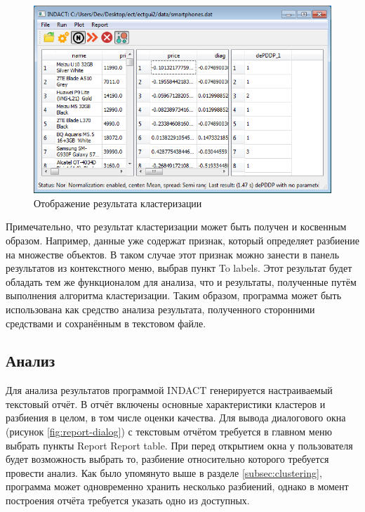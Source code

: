 \documentclass[12pt]{diploma}
\begin{document}
	\begin{figure}[h!]
		\centering
		\includegraphics[width=0.8\linewidth]{img/clustering-result}		
		\caption{Отображение результата кластеризации}
		\label{fig:clustering-result}
	\end{figure}
	
	Примечательно, что результат кластеризации может быть получен и косвенным образом. Например, данные уже содержат признак, который определяет разбиение на множестве объектов. В таком случае этот признак можно занести в панель результатов из контекстного меню, выбрав пункт To labels. Этот результат будет обладать тем же функционалом для анализа, что и результаты, полученные путём выполнения алгоритма кластеризации. Таким образом, программа может быть использована как средство анализа результата, полученного сторонними средствами и сохранённым в текстовом файле.
	
	\subsection{Анализ}
	Для анализа результатов программой INDACT генерируется настраиваемый текстовый отчёт. В отчёт включены основные характеристики кластеров и разбиения в целом, в том числе оценки качества. Для вывода диалогового окна (рисунок \ref{fig:report-dialog}) с текстовым отчётом требуется в главном меню выбрать пункты Report \textrightarrow Report table. При перед открытием окна у пользователя будет возможность выбрать то, разбиение относительно которого требуется провести анализ. Как было упомянуто выше в разделе \ref{subsec:clustering}, программа может одновременно хранить несколько разбиений, однако в момент построения отчёта требуется указать одно из доступных.
	
\end{document}

